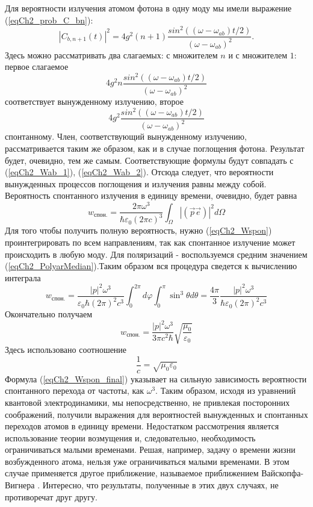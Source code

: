 Для вероятности излучения атомом фотона в одну моду мы имели выражение
(\ref{eqCh2_prob_C_bn}):
\[
\left|C_{b, n + 1}\left(t\right)\right|^2 = 4 g^2 \left(n + 1\right)
\frac{sin^2\left(\left(\omega - \omega_{ab}\right)t/2\right)}
{\left(\omega - \omega_{ab}\right)^2}.
\]
Здесь можно рассматривать два слагаемых: с
множителем $n$ и с 
множителем $1$: первое слагаемое
\[
4 g^2 n
\frac{sin^2\left(\left(\omega - \omega_{ab}\right)t/2\right)}
{\left(\omega - \omega_{ab}\right)^2}
\]
соответствует вынужденному излучению, 
второе 
\[
4 g^2 
\frac{sin^2\left(\left(\omega - \omega_{ab}\right)t/2\right)}
{\left(\omega - \omega_{ab}\right)^2}
\]
спонтанному. Член, соответствующий вынужденному
излучению, рассматривается таким же образом, как и в случае поглощения
фотона. Результат будет, очевидно, тем же самым. Соответствующие
формулы будут совпадать с (\ref{eqCh2_Wab_1}), 
(\ref{eqCh2_Wab_2}). Отсюда следует, что вероятности
вынужденных процессов поглощения и излучения равны между
собой. Вероятность спонтанного излучения в единицу времени, очевидно, 
будет равна 
\begin{equation}
w_{\mbox{спон.}} = 
\frac{2 \pi \omega^3}
{\hbar \varepsilon_0 \left(2 \pi c\right)^3}
\int_{\Omega}
\left|\left(\vec{p} \vec{e}\right)\right|^2
d \Omega
\label{eqCh2_Wspon}
\end{equation}
Для того чтобы получить полную вероятность, нужно (\ref{eqCh2_Wspon})
проинтегрировать по всем направлениям, так как спонтанное излучение
может происходить в любую моду. Для поляризаций - воспользуемся
средним значением (\ref{eqCh2_PolyarMedian}).Таким образом вся
процедура сведется к вычислению интеграла 
\begin{equation}
w_{\mbox{спон.}} = 
\frac{\left|p\right|^2 \omega^3}
{\varepsilon_0 \hbar \left(2 \pi\right)^2 c^3}
\int_{0}^{2 \pi}d \varphi \int_0^{\pi}
\sin^3 \theta d \theta
= 
\frac{4 \pi}{3}\frac{\left|p\right|^2 \omega^3}
{\hbar \varepsilon_0 \left(2 \pi\right)^2 c^3}
\end{equation}
Окончательно получаем
\begin{equation}
w_{\mbox{спон.}} = 
\frac{\left|p\right|^2 \omega^3}
{3 \pi c^2 \hbar}
\sqrt{\frac{\mu_0}{\varepsilon_0}}
\label{eqCh2_Wspon_final}
\end{equation}
Здесь использовано соотношение  
\[
\frac{1}{c} = \sqrt{\mu_0 \varepsilon_0}
\]
Формула (\ref{eqCh2_Wspon_final}) указывает на сильную
зависимость вероятности спонтанного перехода от частоты, как  
$\omega^3$.  Таким
образом, исходя из уравнений квантовой электродинамики, мы
непосредственно, не привлекая посторонних соображений, получили
выражения для вероятностей вынужденных и спонтанных переходов атомов в
единицу времени. Недостатком рассмотрения является использование
теории возмущения и, следовательно, необходимость ограничиваться
малыми временами. Решая, например, задачу о времени жизни
возбужденного атома, нельзя уже ограничиваться малыми временами. В
этом случае применяется другое приближение, называемое приближением
Вайскопфа-Вигнера \cite{bLuisell1972}. Интересно, что результаты,
полученные в этих двух случаях, не противоречат друг другу.  

